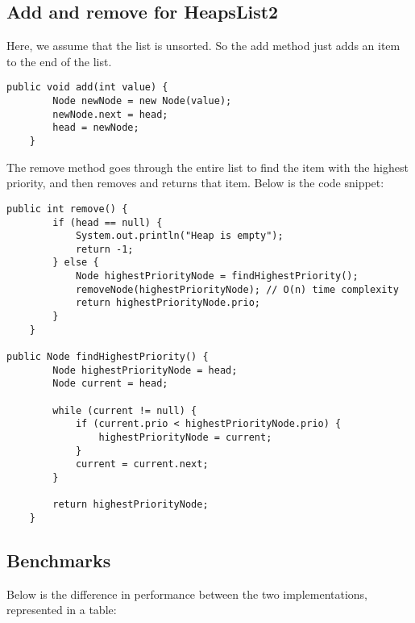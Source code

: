 \documentclass[a4paper,11pt]{article}
\begin{document}
\subsection*{Add and remove for HeapsList2}
Here, we assume that the list is unsorted. So the add method just adds an item to the end of the list.

\begin{verbatim}
public void add(int value) {
        Node newNode = new Node(value);
        newNode.next = head;
        head = newNode;
    }
\end{verbatim}

The remove method goes through the entire list to find the item with the highest priority, and then removes and returns that item. Below is the code snippet:

\begin{verbatim}
public int remove() {
        if (head == null) {
            System.out.println("Heap is empty");
            return -1; 
        } else {
            Node highestPriorityNode = findHighestPriority();
            removeNode(highestPriorityNode); // O(n) time complexity
            return highestPriorityNode.prio;
        }
    }

public Node findHighestPriority() {
        Node highestPriorityNode = head;
        Node current = head;

        while (current != null) {
            if (current.prio < highestPriorityNode.prio) {
                highestPriorityNode = current;
            }
            current = current.next;
        }

        return highestPriorityNode;
    }
\end{verbatim}


\subsection*{Benchmarks}
Below is the difference in performance between the two implementations, represented in a table:
\end{document}
